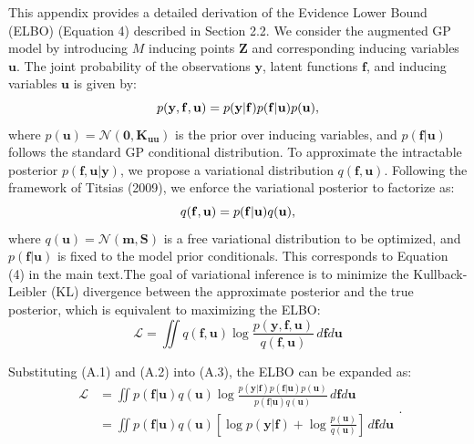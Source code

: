 \documentclass[11pt]{article}
\begin{document}
	This appendix provides a detailed derivation of the Evidence Lower Bound (ELBO) (Equation 4) described in Section 2.2. We consider the augmented GP model by introducing $M$ inducing points $\mathbf{Z}$ and corresponding inducing variables $\mathbf{u}$. The joint probability of the observations $\mathbf{y}$, latent functions $\mathbf{f}$, and inducing variables $\mathbf{u}$ is given by:
	\begin{equation}
		p({\bf{y}},{\bf{f}},{\bf{u}}) = p({\bf{y}}|{\bf{f}})p({\bf{f}}|{\bf{u}})p({\bf{u}}),
	\end{equation}
	where $p(\mathbf{u}) = \mathcal{N}(\mathbf{0}, \mathbf{K}_{\mathbf{uu}})$ is the prior over inducing variables, and $p(\mathbf{f} | \mathbf{u})$ follows the standard GP conditional distribution. To approximate the intractable posterior $p(\mathbf{f}, \mathbf{u} | \mathbf{y})$, we propose a variational distribution $q(\mathbf{f}, \mathbf{u})$. Following the framework of Titsias (2009), we enforce the variational posterior to factorize as:
	\begin{equation}
		q({\bf{f}},{\bf{u}}) = p({\bf{f}}|{\bf{u}})q({\bf{u}}),
	\end{equation}
	where $q(\mathbf{u}) = \mathcal{N}(\mathbf{m}, \mathbf{S})$ is a free variational distribution to be optimized, and $p(\mathbf{f} | \mathbf{u})$ is fixed to the model prior conditionals. This corresponds to Equation (4) in the main text.The goal of variational inference is to minimize the Kullback-Leibler (KL) divergence between the approximate posterior and the true posterior, which is equivalent to maximizing the ELBO:
	\begin{equation}
		\mathcal{L} = \iint q(\mathbf{f}, \mathbf{u}) \log \frac{p(\mathbf{y}, \mathbf{f}, \mathbf{u})}{q(\mathbf{f}, \mathbf{u})} \, d\mathbf{f} d\mathbf{u}
	\end{equation}
	
	Substituting (A.1) and (A.2) into (A.3), the ELBO can be expanded as:
	\begin{equation}
		\begin{aligned}
			\mathcal{L} &= \iint p(\mathbf{f}|\mathbf{u})q(\mathbf{u}) \log \frac{p(\mathbf{y}|\mathbf{f})p(\mathbf{f}|\mathbf{u})p(\mathbf{u})}{p(\mathbf{f}|\mathbf{u})q(\mathbf{u})} \, d\mathbf{f}d\mathbf{u} \\
			&= \iint p(\mathbf{f}|\mathbf{u})q(\mathbf{u}) \left[ \log p(\mathbf{y}|\mathbf{f}) + \log \frac{p(\mathbf{u})}{q(\mathbf{u})} \right] \, d\mathbf{f}d\mathbf{u}
		\end{aligned}.
	\end{equation}
	
\end{document}
